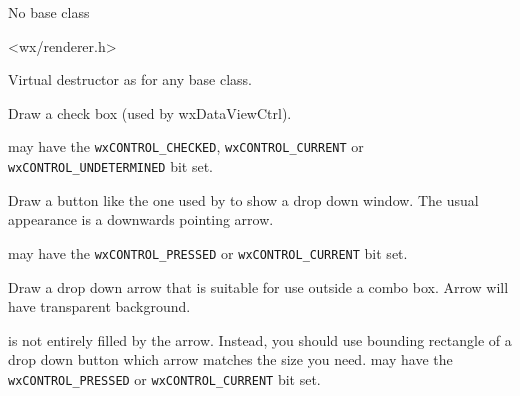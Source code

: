 
No base class


<wx/renderer.h>




\label{wxrenderernativedtor}


Virtual destructor as for any base class.


\label{wxrenderernativedrawcheckbox}


Draw a check box (used by wxDataViewCtrl).

 may have the \texttt{wxCONTROL\_CHECKED}, \texttt{wxCONTROL\_CURRENT} or
\texttt{wxCONTROL\_UNDETERMINED} bit set.


\label{wxrenderernativedrawcomboboxdropbutton}


Draw a button like the one used by  to show a
drop down window. The usual appearance is a downwards pointing arrow.

 may have the \texttt{wxCONTROL\_PRESSED} or \texttt{wxCONTROL\_CURRENT} bit set.


\label{wxrenderernativedrawdroparrow}


Draw a drop down arrow that is suitable for use outside a combo box. Arrow will have
transparent background.

 is not entirely filled by the arrow. Instead, you should use bounding
rectangle of a drop down button which arrow matches the size you need.
 may have the \texttt{wxCONTROL\_PRESSED} or \texttt{wxCONTROL\_CURRENT} bit set.


\label{wxrenderernativedrawheaderbutton}

